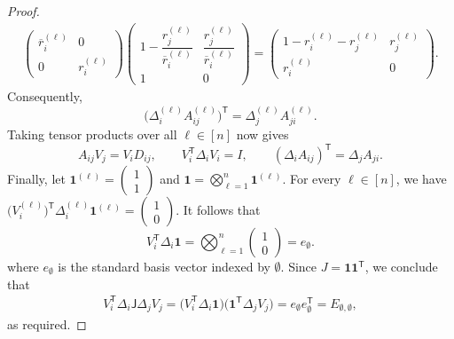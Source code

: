 \documentclass[11pt]{article}
\numberwithin{equation}{section}
\theoremstyle{definition}
\theoremstyle{remark}
\begin{document}
\begin{proof}
$$\begin{aligned}
\begin{pmatrix}
  \overline r_i^{(\ell)}&0\\
  0&r_i^{(\ell)}
 \end{pmatrix}
 \begin{pmatrix}
  1-\dfrac{r_j^{(\ell)}}{\overline r_i^{(\ell)}}&
  \dfrac{r_j^{(\ell)}}{\overline r_i^{(\ell)}}\\[5pt]
  1&0
 \end{pmatrix}=
 \begin{pmatrix}
  1-r_i^{(\ell)}-r_j^{(\ell)}&r_j^{(\ell)}\\
  r_i^{(\ell)}&0
 \end{pmatrix}.
\end{aligned}
$$
Consequently,
$$
 \bigl(\Delta_i^{(\ell)}A_{ij}^{(\ell)}\bigr)^{\mathsf T}
 =
 \Delta_j^{(\ell)}A_{ji}^{(\ell)}.
$$
Taking tensor products over all $\ell\in[n]$ now gives
$$
 A_{ij}V_j=V_iD_{ij},
 \qquad
 V_i^{\mathsf T}\Delta_iV_i=I,
 \qquad
 (\Delta_iA_{ij})^{\mathsf T}=\Delta_jA_{ji}.
$$
Finally, let
$
 \mathbf 1^{(\ell)}=\begin{pmatrix}1\\1\end{pmatrix}$
and
$
 \mathbf 1=\bigotimes_{\ell=1}^n\mathbf 1^{(\ell)}.
$
For every $\ell\in[n]$, we have
$
 \bigl(V_i^{(\ell)}\bigr)^{\mathsf T}
 \Delta_i^{(\ell)}\mathbf 1^{(\ell)}
 =
 \begin{pmatrix}1\\0\end{pmatrix}.
$
It follows that
$$
 V_i^{\mathsf T}\Delta_i\mathbf 1
 =
 \bigotimes_{\ell=1}^n
 \begin{pmatrix}1\\0\end{pmatrix}
 =
 e_{\emptyset}.
$$
where $e_{\emptyset}$ is the standard basis vector indexed by $\emptyset$.
Since $ J=\mathbf 1\mathbf 1^{\mathsf T}$, we conclude that
$$
\begin{aligned}
 V_i^{\mathsf T}\Delta_i\mathsf J\Delta_jV_j
 =
 \bigl(V_i^{\mathsf T}\Delta_i\mathbf 1\bigr)
 \bigl(\mathbf 1^{\mathsf T}\Delta_jV_j\bigr)=
 e_{\emptyset}e_{\emptyset}^{\mathsf T}
 =
 E_{\emptyset,\emptyset},
\end{aligned}
$$
as required.
\end{proof}
\end{document}
